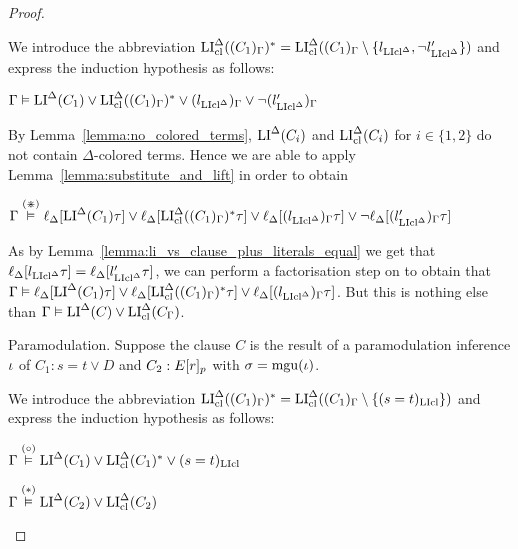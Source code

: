 \documentclass[,%
	draft=false,%
	numbers=noendperiod
	11pt,
	a4paper,
	oneside,%
	openany,
]{memoir}
\begin{document}
\begin{proof}
\begin{description}
			We introduce the abbreviation
			$\operatorname{LI}_{\operatorname{cl}}^\Delta( (C_1)_\Gamma)^* = \operatorname{LI}_{\operatorname{cl}}^\Delta( (C_1)_\Gamma \setminus \{l_{\operatorname{LIcl}^\Delta}, \lnot l'_{\operatorname{LIcl}^\Delta}\} )$
			and express the induction hypothesis as follows:

			$\Gamma \vDash \operatorname{LI}^\Delta(C_1) \lor \operatorname{LI}_{\operatorname{cl}}^\Delta( (C_1)_\Gamma)^* \lor (l_{\operatorname{LIcl}^\Delta})_\Gamma \lor \lnot (l'_{\operatorname{LIcl}^\Delta})_\Gamma$

			By Lemma~\ref{lemma:no_colored_terms}, $\operatorname{LI}^\Delta(C_i)$ and $\operatorname{LI}_{\operatorname{cl}}^\Delta(C_i)$ for $i\in\{1,2\}$ do not contain $\Delta$-colored terms. 
			Hence we are able to apply Lemma~\ref{lemma:substitute_and_lift} in order to obtain

			$\Gamma \stackrel{(\divideontimes)}{\vDash} \ell_{\Delta}[\operatorname{LI}^\Delta(C_1)\tau] \lor \ell_{\Delta}[\operatorname{LI}_{\operatorname{cl}}^\Delta( (C_1)_\Gamma)^*\tau] \lor \ell_{\Delta}[(l_{\operatorname{LIcl}^\Delta})_\Gamma\tau] \lor \lnot \ell_{\Delta}[(l'_{\operatorname{LIcl}^\Delta})_\Gamma\tau]$

			As by Lemma~\ref{lemma:li_vs_clause_plus_literals_equal} we get that 
			$\ell_{\Delta}[l_{\operatorname{LIcl}^\Delta}\tau] = 
			\ell_{\Delta}[l'_{\operatorname{LIcl}^\Delta}\tau]$,
			we can perform a factorisation step on \markC{} to obtain that 
			$\Gamma \vDash \ell_{\Delta}[\operatorname{LI}^\Delta(C_1)\tau] \lor \ell_{\Delta}[\operatorname{LI}_{\operatorname{cl}}^\Delta( (C_1)_\Gamma)^*\tau] \lor \ell_{\Delta}[(l_{\operatorname{LIcl}^\Delta})_\Gamma\tau]$.
			But this is nothing else than $\Gamma \vDash \operatorname{LI}^\Delta(C) \lor \operatorname{LI}_{\operatorname{cl}}^\Delta(C_\Gamma)$.
			\qedhere


		\item{} Paramodulation.
			Suppose the clause $C$ is the result of a paramodulation inference $\iota$ of $C_1: s=t \lor D$ and $C_2: E{[r]_{p}}$ with $\sigma=\operatorname{mgu}(\iota)$.

			We introduce the abbreviation $\operatorname{LI}_{\operatorname{cl}}^\Delta((C_1)_\Gamma)^* = \operatorname{LI}_{\operatorname{cl}}^\Delta( (C_1)_\Gamma \setminus \{ (s=t)_{\operatorname{LIcl}}\})$ and express the induction hypothesis as follows:

			$\Gamma \stackrel{(\circ)}{\vDash} \operatorname{LI}^\Delta(C_1) \lor \operatorname{LI}_{\operatorname{cl}}^\Delta(C_1)^* \lor (s=t)_{\operatorname{LIcl}} $

			$\Gamma \stackrel{(*)}{\vDash} \operatorname{LI}^\Delta(C_2) \lor \operatorname{LI}_{\operatorname{cl}}^\Delta(C_2)$







\end{description}
\end{proof}
\end{document}

